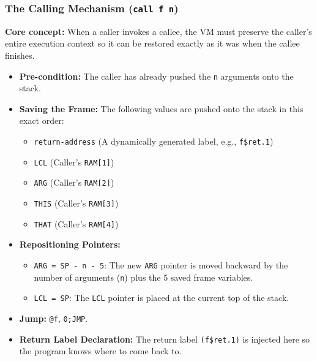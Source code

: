 \documentclass[12pt,a4paper]{article}
\begin{document}
\subsubsection*{The Calling Mechanism (\texttt{call f n})}
\textbf{Core concept:} When a caller invokes a callee, the VM must preserve the caller's entire execution context so it can be restored exactly as it was when the callee finishes.
\begin{itemize}
    \item \textbf{Pre-condition:} The caller has already pushed the \texttt{n} arguments onto the stack.
    \item \textbf{Saving the Frame:} The following values are pushed onto the stack in this exact order:
    \begin{itemize}
        \item \texttt{return-address} (A dynamically generated label, e.g., \texttt{f\$ret.1})
        \item \texttt{LCL} (Caller's \texttt{RAM[1]})
        \item \texttt{ARG} (Caller's \texttt{RAM[2]})
        \item \texttt{THIS} (Caller's \texttt{RAM[3]})
        \item \texttt{THAT} (Caller's \texttt{RAM[4]})
    \end{itemize}
    \item \textbf{Repositioning Pointers:}
    \begin{itemize}
        \item \texttt{ARG = SP - n - 5}: The new \texttt{ARG} pointer is moved backward by the number of arguments (\texttt{n}) plus the 5 saved frame variables.
        \item \texttt{LCL = SP}: The \texttt{LCL} pointer is placed at the current top of the stack.
    \end{itemize}
    \item \textbf{Jump:} \texttt{@f}, \texttt{0;JMP}.
    \item \textbf{Return Label Declaration:} The return label \texttt{(f\$ret.1)} is injected here so the program knows where to come back to.
\end{itemize}
\end{document}

